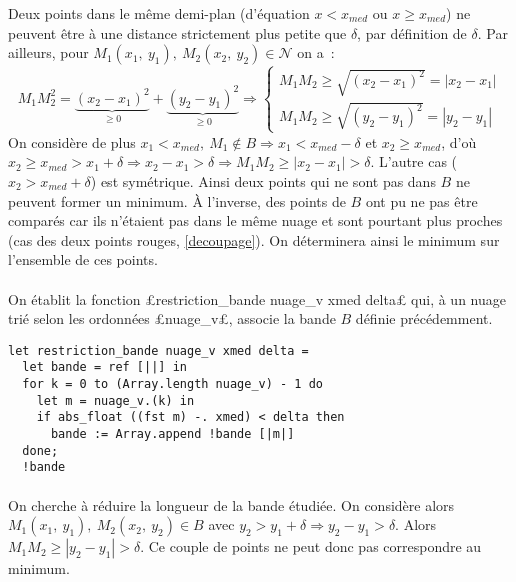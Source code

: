 \documentclass{article}
\begin{document}
  Deux points dans le même demi-plan (d'équation $x < x_{med}$ ou $x \geqslant x_{med}$) ne peuvent être à une distance strictement plus petite que $\delta$, par définition de $\delta$. Par ailleurs, pour $M_1(x_1,\ y_1),\ M_2(x_2,\ y_2)\in\mathcal{N}$ on a~:
  \begin{displaymath}
    M_1M_2^2 = \underbrace{(x_2 - x_1)^2}_{\geqslant 0} + \underbrace{(y_2 - y_1)^2}_{\geqslant 0} \Longrightarrow
    \left\{\begin{array}{l}
    M_1M_2 \geqslant \sqrt{(x_2 - x_1)^2} = |x_2 - x_1| \\
    M_1M_2 \geqslant \sqrt{(y_2 - y_1)^2} = |y_2 - y_1|
    \end{array}\right.
  \end{displaymath}
  On considère de plus $x_1 < x_{med},\ M_1\not\in B \Longrightarrow x_1 < x_{med} - \delta$ et $x_2 \geqslant x_{med}$, d'où $x_2 \geqslant x_{med} > x_1 + \delta \Longrightarrow x_2 - x_1 > \delta \Longrightarrow M_1M_2 \geqslant |x_2 - x_1| > \delta$. L'autre cas ($x_2 > x_{med} + \delta$) est symétrique.
  Ainsi deux points qui ne sont pas dans $B$ ne peuvent former un minimum. À l'inverse, des points de $B$ ont pu ne pas être comparés car ils n'étaient pas dans le même nuage et sont pourtant plus proches (cas des deux points rouges, \ref{decoupage}). On déterminera ainsi le minimum sur l'ensemble de ces points.

  \paragraph{} On établit la fonction £restriction_bande nuage_v xmed delta£ qui, à un nuage trié selon les ordonnées £nuage_v£, associe la bande $B$ définie précédemment.

  \begin{lstlisting}
let restriction_bande nuage_v xmed delta =
  let bande = ref [||] in
  for k = 0 to (Array.length nuage_v) - 1 do
    let m = nuage_v.(k) in
    if abs_float ((fst m) -. xmed) < delta then
      bande := Array.append !bande [|m|]
  done;
  !bande
  \end{lstlisting}

  \paragraph{} On cherche à réduire la longueur de la bande étudiée. On considère alors $M_1(x_1,\ y_1),\ M_2(x_2,\ y_2)\in B$ avec $y_2 > y_1 + \delta \Longrightarrow y_2 - y_1 > \delta$. Alors $M_1M_2 \geqslant |y_2 - y_1| > \delta$. Ce couple de points ne peut donc pas correspondre au minimum.
\end{document}
